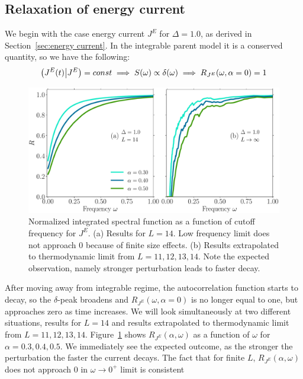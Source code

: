 \subsection{Relaxation of energy current}
We begin with the case energy current \(J^E\) for \(\Delta = 1.0\), as derived in Section~\ref{sec:energy current}.
In the integrable parent model it is a conserved quantity, so we have the following:
\begin{equation*}
  \left(J^E(t) \middle| J^E\right) = const \implies S(\omega) \propto \delta(\omega)
  \implies R_{J^E}(\omega,\alpha=0) = 1
\end{equation*}
\begin{figure}[ht]
  \centering
  \includegraphics[width=\figsize\textwidth]{Figures/current_no_scaling.pdf}
  \caption{Normalized integrated spectral function as a function of cutoff frequency for \(J^E\).
  (a) Results for \(L=14\). Low frequency limit does not approach 0
  because of finite size effects. (b) Results extrapolated to thermodynamic limit from \(L=11,12,13,14\).
  Note the expected observation, namely stronger perturbation leads to faster decay.}
  \label{fig:current decay no scaling}
\end{figure}
After moving away from integrable regime, the autocorrelation function starts to decay,
so the \(\delta\)-peak broadens and \(R_{J^E}(\omega,\alpha=0)\) is no longer equal to one,
but approaches zero as time increases. We will look simultaneously at two different situations,
results for \(L=14\) and results extrapolated to thermodynamic limit from \(L=11,12,13,14\). 
Figure~\ref{fig:current decay no scaling} shows \(R_{J^E}(\alpha,\omega)\) as a
function of \(\omega\) for \(\alpha=0.3,0.4,0.5\). We immediately see the expected outcome, as the
stronger the perturbation the faster the current decays. The fact that for finite \(L\),
\(R_{J^E}(\alpha,\omega)\) does not approach \(0\) in \(\omega\to 0^+\) limit is consistent
